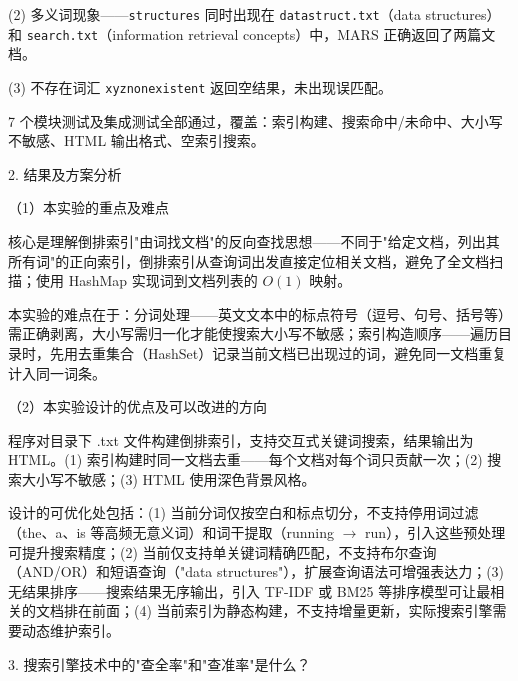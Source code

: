 \noindent\hspace*{2em}(2) 多义词现象——\texttt{structures} 同时出现在 \texttt{datastruct.txt}（data structures）和 \texttt{search.txt}（information retrieval concepts）中，MARS 正确返回了两篇文档。\par
\noindent\hspace*{2em}(3) 不存在词汇 \texttt{xyznonexistent} 返回空结果，未出现误匹配。\par
\noindent\hspace*{2em}7 个模块测试及集成测试全部通过，覆盖：索引构建、搜索命中/未命中、大小写不敏感、HTML 输出格式、空索引搜索。\par

\noindent\hspace*{2em}2. 结果及方案分析\par
\noindent\hspace*{2em}（1）本实验的重点及难点\par
\noindent\hspace*{2em}核心是理解倒排索引"由词找文档"的反向查找思想——不同于"给定文档，列出其所有词"的正向索引，倒排索引从查询词出发直接定位相关文档，避免了全文档扫描；使用 HashMap 实现词到文档列表的 $O(1)$ 映射。\par
\noindent\hspace*{2em}本实验的难点在于：分词处理——英文文本中的标点符号（逗号、句号、括号等）需正确剥离，大小写需归一化才能使搜索大小写不敏感；索引构造顺序——遍历目录时，先用去重集合（HashSet）记录当前文档已出现过的词，避免同一文档重复计入同一词条。\par
\noindent\hspace*{2em}（2）本实验设计的优点及可以改进的方向\par
\noindent\hspace*{2em}程序对目录下 .txt 文件构建倒排索引，支持交互式关键词搜索，结果输出为 HTML。(1) 索引构建时同一文档去重——每个文档对每个词只贡献一次；(2) 搜索大小写不敏感；(3) HTML 使用深色背景风格。\par
\noindent\hspace*{2em}设计的可优化处包括：(1) 当前分词仅按空白和标点切分，不支持停用词过滤（the、a、is 等高频无意义词）和词干提取（running $\to$ run），引入这些预处理可提升搜索精度；(2) 当前仅支持单关键词精确匹配，不支持布尔查询（AND/OR）和短语查询（"data structures"），扩展查询语法可增强表达力；(3) 无结果排序——搜索结果无序输出，引入 TF-IDF 或 BM25 等排序模型可让最相关的文档排在前面；(4) 当前索引为静态构建，不支持增量更新，实际搜索引擎需要动态维护索引。\par
\noindent\hspace*{2em}3. 搜索引擎技术中的"查全率"和"查准率"是什么？\par
